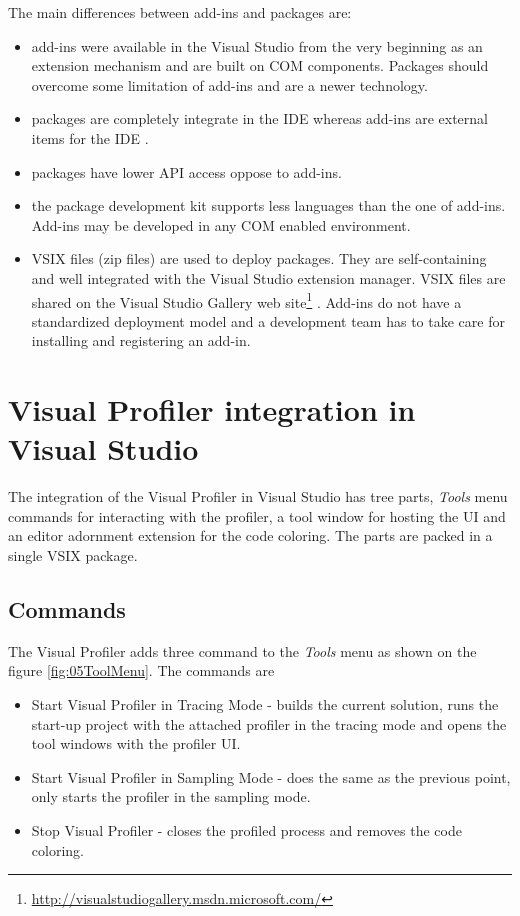 The main differences between add-ins and packages are:
\begin{itemize}	
\item  add-ins were available in the Visual Studio from the very beginning as an extension mechanism and are built on COM components. Packages should overcome some limitation of add-ins and are a newer technology.

\item packages are completely integrate in the IDE whereas add-ins are external items for the IDE  .

\item packages have lower API access oppose to add-ins.

\item the package development kit supports less languages than the one of add-ins. Add-ins may be developed in any COM enabled environment.

\item VSIX files (zip files) are used to deploy packages. They are self-containing and well integrated with the Visual Studio extension manager. VSIX files are shared on the Visual Studio Gallery web site\footnote{\href{http://visualstudiogallery.msdn.microsoft.com/}{http://visualstudiogallery.msdn.microsoft.com/}}
. Add-ins do not have a standardized deployment model and a development team has to take care for installing and registering an add-in.
\end{itemize}


\section{Visual Profiler integration in Visual Studio}
The integration of the Visual Profiler in Visual Studio has tree parts, \textit{Tools} menu commands for interacting with the profiler, a tool window for hosting the UI and an editor adornment extension for the code coloring. The parts are packed in a single VSIX package.

\subsection{Commands}
The Visual Profiler adds three command to the \textit{Tools} menu as shown on the figure \ref{fig:05ToolMenu}. The commands are


\begin{itemize}
\item Start Visual Profiler in Tracing Mode - builds the current solution, runs the start-up project with the attached profiler in the tracing mode and opens the tool windows with the profiler UI.

\item Start Visual Profiler in Sampling Mode - does the same as the previous point, only  starts the profiler in the sampling mode.

\item Stop Visual Profiler - closes the profiled process and removes the code coloring.
\end{itemize}

